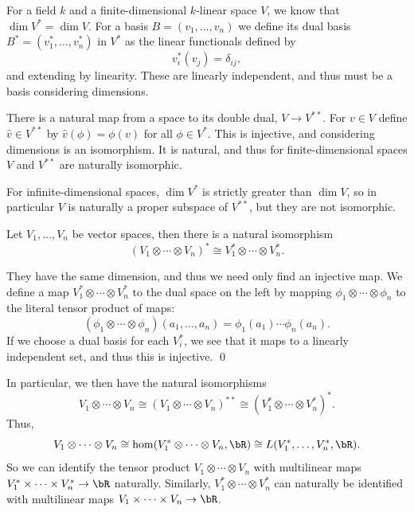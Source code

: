     For a field $k$ and a finite-dimensional $k$-linear space $V$, we know that $\dim V^*=\dim V$.
    For a basis $B=(v_1,\dots,v_n)$ we define its {\emphcolor dual basis} $B^*=(v_1^*,\dots,v_n^*)$ in $V^*$ as the linear functionals
    defined by
    $$ v_i^*(v_j) = \delta_{ij} , $$
    and extending by linearity.
    These are linearly independent, and thus must be a basis considering dimensions.

    There is a natural map from a space to its double dual, $V\to V^{**}$.
    For $v\in V$ define $\hat v\in V^{**}$ by $\hat v(\phi)=\phi(v)$ for all $\phi\in V^*$.
    This is injective, and considering dimensions is an isomorphism.
    It is natural, and thus for finite-dimensional spaces $V$ and $V^{**}$ are naturally isomorphic.

    For infinite-dimensional spaces, $\dim V^*$ is strictly greater than $\dim V$, so in particular $V$ is naturally a proper subspace of
    $V^{**}$, but they are not isomorphic.

\enote

\bprop

    Let $V_1,\dots,V_n$ be vector spaces, then there is a natural isomorphism
    $$ (V_1\otimes\cdots\otimes V_n)^* \cong V_1^*\otimes\cdots\otimes V_n^* . $$

\eprop

\bproof

    They have the same dimension, and thus we need only find an injective map.
    We define a map $V_1^*\otimes\cdots\otimes V_n^*$ to the dual space on the left by mapping $\phi_1\otimes\cdots\otimes\phi_n$ to the
    literal tensor product of maps:
    $$ (\phi_1\otimes\cdots\otimes\phi_n)(a_1,\dots,a_n) = \phi_1(a_1)\cdots\phi_n(a_n) . $$
    If we choose a dual basis for each $V_i^*$, we see that it maps to a linearly independent set, and thus this is injective.
    \qed

\eproof

In particular, we then have the natural isomorphisms
$$ V_1\otimes\cdots\otimes V_n \cong (V_1\otimes\cdots\otimes V_n)^{**} \cong (V_1^*\otimes\cdots\otimes V_n^*)^* . $$
Thus,
$$ V_1\otimes\cdots\otimes V_n \cong \hom(V_1^*\otimes\cdots\otimes V_n,\bR) \cong L(V_1^*,\dots,V_n^*,\bR) . $$
So we can identify the tensor product $V_1\otimes\cdots\otimes V_n$ with multilinear maps $V_1^*\times\cdots\times V_n^*\to\bR$ naturally.
Similarly, $V_1^*\otimes\cdots\otimes V_n^*$ can naturally be identified with multilinear maps $V_1\times\cdots\times V_n\to\bR$.

